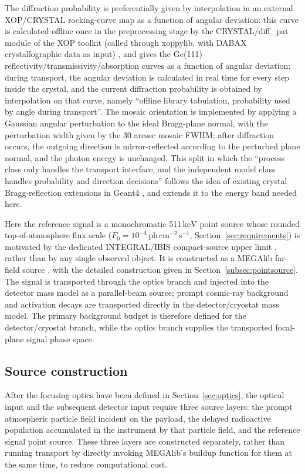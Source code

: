 \documentclass[11pt]{article}
\newcommand{\keV}{\ensuremath{\,\mathrm{keV}}}
\newcommand{\phcms}{\ensuremath{\,\mathrm{ph\,cm^{-2}\,s^{-1}}}}
\newcommand{\fzero}{F_{0}}
\begin{document}
The diffraction probability is preferentially given by interpolation in an external XOP/CRYSTAL rocking-curve map as a function of angular deviation: this curve is calculated offline once in the preprocessing stage by the CRYSTAL/diff\_pat module of the XOP toolkit (called through xoppylib, with DABAX crystallographic data as input) \cite{SanchezDelRio2011XOP}, and gives the Ge(111) reflectivity/transmissivity/absorption curves as a function of angular deviation; during transport, the angular deviation is calculated in real time for every step inside the crystal, and the current diffraction probability is obtained by interpolation on that curve, namely ``offline library tabulation, probability used by angle during transport''. The mosaic orientation is implemented by applying a Gaussian angular perturbation to the ideal Bragg-plane normal, with the perturbation width given by the 30 arcsec mosaic FWHM; after diffraction occurs, the outgoing direction is mirror-reflected according to the perturbed plane normal, and the photon energy is unchanged. This split in which the ``process class only handles the transport interface, and the independent model class handles probability and direction decisions'' follows the idea of existing crystal Bragg-reflection extensions in Geant4 \cite{Guan2023BraggReflection,Reiazi2025G4BraggReflection}, and extends it to the energy band needed here.

Here the reference signal is a monochromatic 511\keV{} point source whose
rounded top-of-atmosphere flux scale
($\fzero=10^{-4}\phcms$, Section~\ref{sec:requirements}) is motivated by the
dedicated INTEGRAL/IBIS compact-source upper limit \cite{DeCesare2011}, rather
than by any single observed object. It is constructed as a MEGAlib far-field source
\cite{Zoglauer2006}, with the detailed construction given in
Section~\ref{subsec:pointsource}. The signal is transported through the optics
branch and injected into the detector mass model as a parallel-beam source;
prompt cosmic-ray background and activation decays are transported directly in
the detector/cryostat mass model. The primary background budget is therefore
defined for the detector/cryostat branch, while the optics branch supplies the
transported focal-plane signal phase space.

\subsection{Source construction}
\label{sec:background}

After the focusing optics have been defined in Section~\ref{sec:optics}, the
optical input and the subsequent detector input require three source layers: the
prompt atmospheric particle field incident on the payload, the delayed
radioactive population accumulated in the instrument by that particle field, and
the reference signal point source. These three layers are constructed
separately, rather than running transport by directly invoking MEGAlib's buildup
function for them at the same time, to reduce computational cost.
\end{document}
